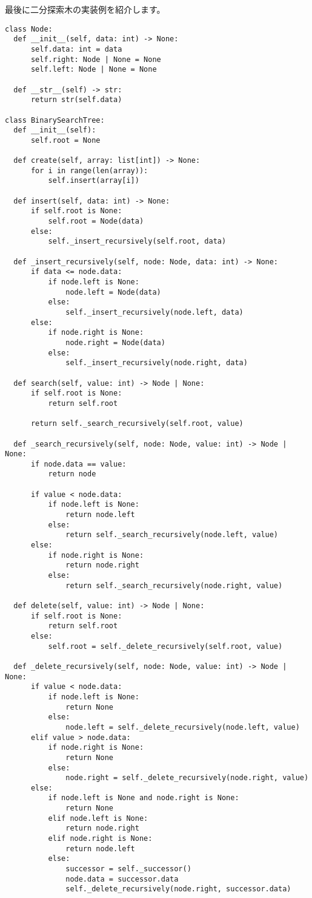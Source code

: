 最後に二分探索木の実装例を紹介します。
\begin{lstlisting}[caption=二分木の実装, frame=TRBL, label={binary_tree}]
class Node:
  def __init__(self, data: int) -> None:
      self.data: int = data
      self.right: Node | None = None
      self.left: Node | None = None
      
  def __str__(self) -> str:
      return str(self.data)
  
class BinarySearchTree:
  def __init__(self):
      self.root = None
      
  def create(self, array: list[int]) -> None:
      for i in range(len(array)):
          self.insert(array[i])
  
  def insert(self, data: int) -> None:
      if self.root is None:
          self.root = Node(data)
      else:
          self._insert_recursively(self.root, data)
  
  def _insert_recursively(self, node: Node, data: int) -> None:
      if data <= node.data:
          if node.left is None:
              node.left = Node(data)
          else:
              self._insert_recursively(node.left, data)
      else:
          if node.right is None:
              node.right = Node(data)
          else:
              self._insert_recursively(node.right, data)
  
  def search(self, value: int) -> Node | None:
      if self.root is None:
          return self.root
      
      return self._search_recursively(self.root, value)
      
  def _search_recursively(self, node: Node, value: int) -> Node | None:
      if node.data == value:
          return node
      
      if value < node.data:
          if node.left is None:
              return node.left
          else:
              return self._search_recursively(node.left, value)
      else:
          if node.right is None:
              return node.right
          else:
              return self._search_recursively(node.right, value)
  
  def delete(self, value: int) -> Node | None:
      if self.root is None:
          return self.root
      else:
          self.root = self._delete_recursively(self.root, value)
  
  def _delete_recursively(self, node: Node, value: int) -> Node | None:
      if value < node.data:
          if node.left is None:
              return None
          else:
              node.left = self._delete_recursively(node.left, value)
      elif value > node.data:
          if node.right is None:
              return None
          else:
              node.right = self._delete_recursively(node.right, value)
      else:
          if node.left is None and node.right is None:
              return None
          elif node.left is None:
              return node.right
          elif node.right is None:
              return node.left
          else:
              successor = self._successor()
              node.data = successor.data
              self._delete_recursively(node.right, successor.data)
              

\end{lstlisting}
